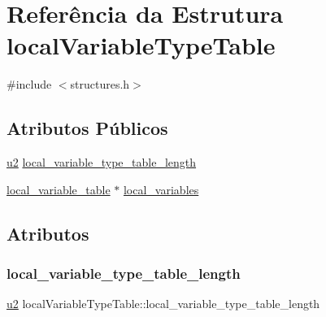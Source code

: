 \hypertarget{structlocalVariableTypeTable}{}\section{Referência da Estrutura local\+Variable\+Type\+Table}
\label{structlocalVariableTypeTable}


{\ttfamily \#include $<$structures.\+h$>$}

\subsection*{Atributos Públicos}
\begin{DoxyCompactItemize}
\item 
\hyperlink{lista__operandos_8h_a732cde1300aafb73b0ea6c2558a7a54f}{u2} \hyperlink{structlocalVariableTypeTable_a9d0ce3852fcf1ee2c60d8c098caaff76}{local\+\_\+variable\+\_\+type\+\_\+table\+\_\+length}
\item 
\hyperlink{structlocal__variable__table}{local\+\_\+variable\+\_\+table} $\ast$ \hyperlink{structlocalVariableTypeTable_acb5bcd42df545b2aeb7517e01e1b5ed0}{local\+\_\+variables}
\end{DoxyCompactItemize}


\subsection{Atributos}
\mbox{\label{structlocalVariableTypeTable_a9d0ce3852fcf1ee2c60d8c098caaff76}} 
\subsubsection{\texorpdfstring{local\+\_\+variable\+\_\+type\+\_\+table\+\_\+length}{local\_variable\_type\_table\_length}}
{\footnotesize\ttfamily \hyperlink{lista__operandos_8h_a732cde1300aafb73b0ea6c2558a7a54f}{u2} local\+Variable\+Type\+Table\+::local\+\_\+variable\+\_\+type\+\_\+table\+\_\+length}

\mbox{\label{structlocalVariableTypeTable_acb5bcd42df545b2aeb7517e01e1b5ed0}} 

